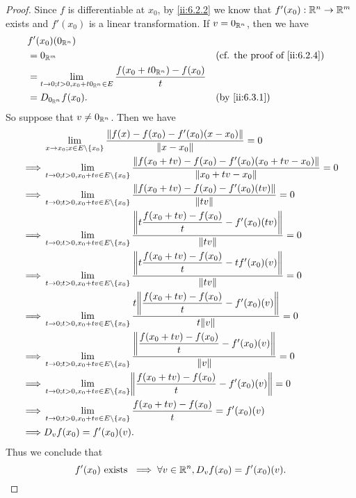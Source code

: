 \begin{proof}
  Since \(f\) is differentiable at \(x_0\), by \cref{ii:6.2.2} we know that \(f'(x_0) : \mathbb{R}^n \to \mathbb{R}^m\) exists and \(f'(x_0)\) is a linear transformation.
  If \(v = 0_{\mathbb{R}^n}\), then we have
  \begin{align*}
     & f'(x_0)(0_{\R^n})                                                                                                                    \\
     & = 0_{\R^m}                                                                               &  & \text{(cf. the proof of \cref{ii:6.2.4})} \\
     & = \lim_{t \to 0 ; t > 0, x_0 + t 0_{\R^n} \in E} \dfrac{f(x_0 + t 0_{\R^n}) - f(x_0)}{t}                                             \\
     & = D_{0_{\R^n}} f(x_0).                                                                   &  & \by{ii:6.3.1}
  \end{align*}
  So suppose that \(v \neq 0_{\mathbb{R}^n}\).
  Then we have
  \begin{align*}
             & \lim_{x \to x_0 ; x \in E \setminus \set{x_0}} \dfrac{\norm*{f(x) - f(x_0) - f'(x_0)(x - x_0)}}{\norm*{x - x_0}} = 0                                  \\
    \implies & \lim_{t \to 0 ; t > 0, x_0 + tv \in E \setminus \set{x_0}} \dfrac{\norm*{f(x_0 + tv) - f(x_0) - f'(x_0)(x_0 + tv - x_0)}}{\norm*{x_0 + tv - x_0}} = 0 \\
    \implies & \lim_{t \to 0 ; t > 0, x_0 + tv \in E \setminus \set{x_0}} \dfrac{\norm*{f(x_0 + tv) - f(x_0) - f'(x_0)(tv)}}{\norm*{tv}} = 0                         \\
    \implies & \lim_{t \to 0 ; t > 0, x_0 + tv \in E \setminus \set{x_0}} \dfrac{\norm*{t \dfrac{f(x_0 + tv) - f(x_0)}{t} - f'(x_0)(tv)}}{\norm*{tv}} = 0            \\
    \implies & \lim_{t \to 0 ; t > 0, x_0 + tv \in E \setminus \set{x_0}} \dfrac{\norm*{t \dfrac{f(x_0 + tv) - f(x_0)}{t} - t f'(x_0)(v)}}{\norm*{tv}} = 0           \\
    \implies & \lim_{t \to 0 ; t > 0, x_0 + tv \in E \setminus \set{x_0}} \dfrac{t \norm*{\dfrac{f(x_0 + tv) - f(x_0)}{t} - f'(x_0)(v)}}{t \norm*{v}} = 0            \\
    \implies & \lim_{t \to 0 ; t > 0, x_0 + tv \in E \setminus \set{x_0}} \dfrac{\norm*{\dfrac{f(x_0 + tv) - f(x_0)}{t} - f'(x_0)(v)}}{\norm*{v}} = 0                \\
    \implies & \lim_{t \to 0 ; t > 0, x_0 + tv \in E \setminus \set{x_0}} \norm*{\dfrac{f(x_0 + tv) - f(x_0)}{t} - f'(x_0)(v)} = 0                                   \\
    \implies & \lim_{t \to 0 ; t > 0, x_0 + tv \in E \setminus \set{x_0}} \dfrac{f(x_0 + tv) - f(x_0)}{t} = f'(x_0)(v)                                               \\
    \implies & D_v f(x_0) = f'(x_0)(v).
  \end{align*}
  Thus we conclude that
  \[
    f'(x_0) \text{ exists } \implies \forall v \in \mathbb{R}^n, D_v f(x_0) = f'(x_0)(v).
  \]
\end{proof}

